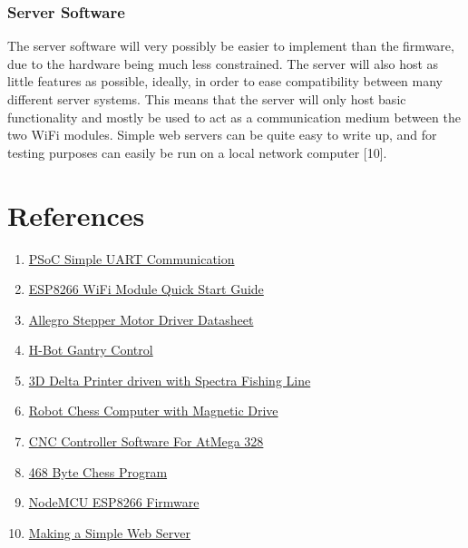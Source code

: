 \documentclass{article}
\begin{document}
\subsubsection*{Server Software}
\indent

The server software will very possibly be easier to implement than the firmware, due to the hardware being much less constrained. The server will also host as little features as possible, ideally, in order to ease compatibility between many different server systems. This means that the server will only host basic functionality and mostly be used to act as a communication medium between the two WiFi modules. Simple web servers can be quite easy to write up, and for testing purposes can easily be run on a local network computer [10].

\section*{References}

\begin{enumerate}

	\item \href{http://www.cypress.com/file/50321/download}{PSoC Simple UART Communication}
	\item \href{http://rancidbacon.com/files/kiwicon8/ESP8266_WiFi_Module_Quick_Start_Guide_v_1.0.4.pdf}{ESP8266 WiFi Module Quick Start Guide}
	\item \href{http://www.farnell.com/datasheets/1923364.pdf}{Allegro Stepper Motor Driver Datasheet}
	\item \href{https://www.acsmotioncontrol.com/sites/ACS/UserContent/files/downloads/level1/Application%20Stories/HBOT%20Application%20Story.pdf}{H-Bot Gantry Control}
	\item \href{http://richrap.com/?p=182}{3D Delta Printer driven with Spectra Fishing Line}
	\item \href{https://www.youtube.com/watch?v=BobOCMj1Qhs}{Robot Chess Computer with Magnetic Drive}
	\item \href{https://github.com/grbl/grbl}{CNC Controller Software For AtMega 328}
	\item \href{http://www.diplomatie.gouv.fr/en/french-foreign-policy/economic-diplomacy-foreign-trade/facts-about-france/one-figure-one-fact/article/468-the-number-of-bytes-in-the}{468 Byte Chess Program}
	\item \href{http://nodemcu.com/index_en.html}{NodeMCU ESP8266 Firmware}
	\item \href{http://ruslanspivak.com/lsbaws-part1/}{Making a Simple Web Server}

\end{enumerate}
\end{document}
